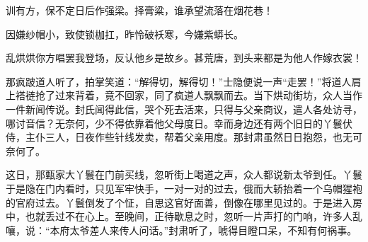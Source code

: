 训有方，保不定日后作强梁。择膏粱，谁承望流落在烟花巷！

因嫌纱帽小，致使锁枷扛，昨怜破袄寒，今嫌紫蟒长。

乱烘烘你方唱罢我登场，反认他乡是故乡。甚荒唐，到头来都是为他人作嫁衣裳！

那疯跛道人听了，拍掌笑道：“解得切，解得切！”士隐便说一声“走罢！”将道人肩上褡裢抢了过来背着，竟不回家，同了疯道人飘飘而去。当下烘动街坊，众人当作一件新闻传说。封氏闻得此信，哭个死去活来，只得与父亲商议，遣人各处访寻，哪讨音信？无奈何，少不得依靠着他父母度日。幸而身边还有两个旧日的丫鬟伏侍，主仆三人，日夜作些针线发卖，帮着父亲用度。那封肃虽然日日抱怨，也无可奈何了。

这日，那甄家大丫鬟在门前买线，忽听街上喝道之声，众人都说新太爷到任。丫鬟于是隐在门内看时，只见军牢快手，一对一对的过去，俄而大轿抬着一个乌帽猩袍的官府过去。丫鬟倒发了个怔，自思这官好面善，倒像在哪里见过的。于是进入房中，也就丢过不在心上。至晚间，正待歇息之时，忽听一片声打的门响，许多人乱嚷，说：“本府太爷差人来传人问话。”封肃听了，唬得目瞪口呆，不知有何祸事。